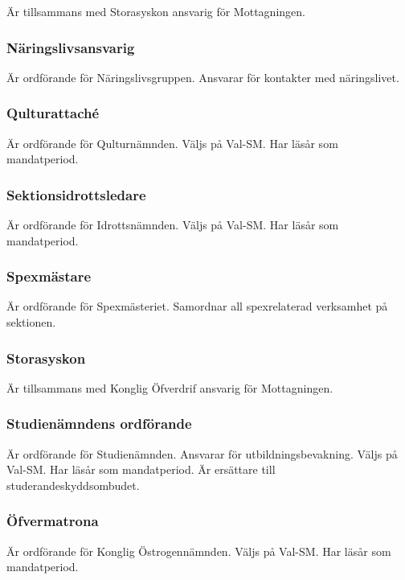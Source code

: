 \documentclass[a4paper,12pt]{article}
\begin{document}
Är tillsammans med Storasyskon ansvarig för Mottagningen.

\subsubsection{Näringslivsansvarig}

Är ordförande för Näringslivsgruppen. Ansvarar för kontakter med näringslivet.

\subsubsection{Qulturattaché}

Är ordförande för Qulturnämnden. Väljs på Val-SM. Har läsår som mandatperiod.

\subsubsection{Sektionsidrottsledare}

Är ordförande för Idrottsnämnden. Väljs på Val-SM. Har läsår som mandatperiod.

\subsubsection{Spexmästare}

Är ordförande för Spexmästeriet. Samordnar all spexrelaterad verksamhet på sektionen.

\subsubsection{Storasyskon}

Är tillsammans med Konglig Öfverdrif ansvarig för Mottagningen.

\subsubsection{Studienämndens ordförande}

Är ordförande för Studienämnden. Ansvarar för utbildningsbevakning. Väljs på Val-SM. Har läsår som mandatperiod. Är ersättare till studerandeskyddsombudet.

\subsubsection{Öfvermatrona}

Är ordförande för Konglig Östrogennämnden. Väljs på Val-SM. Har läsår som
mandatperiod.
\end{document}
